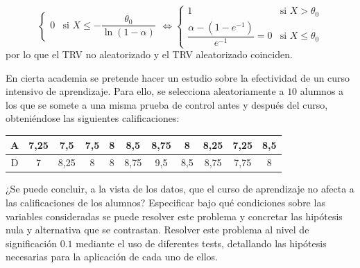 \documentclass[12pt]{article}
\begin{document}
\begin{ejercicio}[2,4 puntos]
\begin{enumerate}
\begin{enumerate}
$$\begin{cases}
                    0 &\text{si } X \leqslant - \dfrac{\theta_0}{\ln(1-\alpha)}
                \end{cases} \iff \begin{cases}
                    1 &\text{si } X > \theta_0 \\
                    \dfrac{\alpha - (1-e^{-1})}{e^{-1}} = 0 &\text{si } X \leqslant \theta_0
                \end{cases}
                $$
                por lo que el TRV no aleatorizado y el TRV aleatorizado coinciden.
            \end{enumerate}
        \end{enumerate}
    \end{ejercicio}

    \newpage

    \begin{ejercicio}[1,1 puntos]
        En cierta academia se pretende hacer un estudio sobre la efectividad de un curso
        intensivo de aprendizaje. Para ello, se selecciona aleatoriamente a $10$ alumnos a los
        que se somete a una misma prueba de control antes y después del curso, obteniéndose
        las siguientes calificaciones:

        \begin{center}
            \begin{tabular}{c|cccccccccc}
                A & 7,25 & 7,5 & 7,5 & 8 & 8,5 & 8,75 & 8 & 8,25 & 7,25 & 8,5 \\
                \hline
                D & 7 & 8,25 & 8 & 8 & 8,75 & 9,5 & 8,5 & 8,75 & 7,75 & 8
            \end{tabular}
        \end{center}

        ¿Se puede concluir, a la vista de los datos, que el curso de aprendizaje no afecta a
        las calificaciones de los alumnos? Especificar bajo qué condiciones sobre las variables
        consideradas se puede resolver este problema y concretar las hipótesis nula y alternativa
        que se contrastan. Resolver este problema al nivel de significación $0{.}1$ mediante el
        uso de diferentes tests, detallando las hipótesis necesarias para la aplicación de cada
        uno de ellos. \\


\end{ejercicio}
\end{document}
